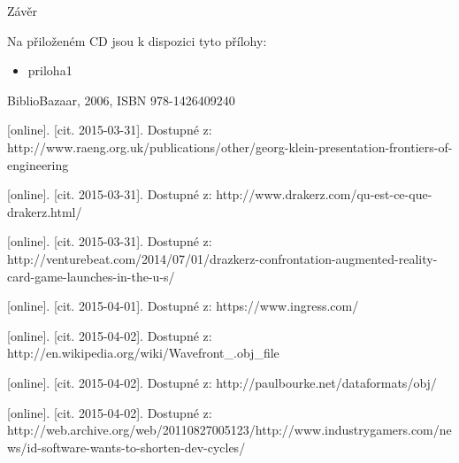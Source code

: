\documentclass[twoside,12pt]{article}
\begin{document}

% 
\newpage

%
%
Závěr

%

%
%
Na přiloženém CD jsou k dispozici tyto přílohy: 
\begin{itemize}
\item priloha1
\end{itemize}


% 
% 
\begin{literatura}

 {
	BiblioBazaar, 2006, ISBN 978-1426409240
}


{
	 [online]. [cit. 2015-03-31]. Dostupné z: 		http://www.raeng.org.uk/publications/other/georg-klein-presentation-frontiers-of-engineering
}

{
	 [online]. [cit. 2015-03-31]. Dostupné z: http://www.drakerz.com/qu-est-ce-que-drakerz.html/
}

{
	 [online]. [cit. 2015-03-31]. Dostupné z: http://venturebeat.com/2014/07/01/drazkerz-confrontation-augmented-reality-card-game-launches-in-the-u-s/
}

{
	 [online]. [cit. 2015-04-01]. Dostupné z: https://www.ingress.com/
}

{
	 [online]. [cit. 2015-04-02]. Dostupné z: http://en.wikipedia.org/wiki/Wavefront\_.obj\_file
}

{
	 [online]. [cit. 2015-04-02]. Dostupné z: http://paulbourke.net/dataformats/obj/
}

{
	 [online]. [cit. 2015-04-02]. Dostupné z: http://web.archive.org/web/20110827005123/http://www.industrygamers.com/news/id-software-wants-to-shorten-dev-cycles/
}


\end{literatura}
\end{document}
